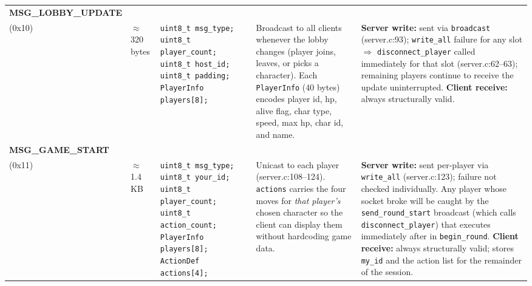 \documentclass[11pt,letterpaper]{article}
\begin{document}
\begin{longtable}{@{}p{1.8cm} p{1.2cm} p{2.4cm} p{4.2cm} p{4.8cm}@{}}
\textbf{MSG\_LOBBY\_UPDATE}\\(0x10) &
$\approx$320 bytes &
\texttt{uint8\_t msg\_type;}\newline
\texttt{uint8\_t player\_count;}\newline
\texttt{uint8\_t host\_id;}\newline
\texttt{uint8\_t padding;}\newline
\texttt{PlayerInfo players[8];} &
Broadcast to all clients whenever the lobby changes (player joins, leaves, or picks a character). Each \texttt{PlayerInfo} (40 bytes) encodes player id, hp, alive flag, char type, speed, max hp, char id, and name. &
\textbf{Server write:} sent via \texttt{broadcast} (server.c:93); \texttt{write\_all} failure for any slot $\Rightarrow$ \texttt{disconnect\_player} called immediately for that slot (server.c:62--63); remaining players continue to receive the update uninterrupted. \textbf{Client receive:} always structurally valid. \\[4pt]

\textbf{MSG\_GAME\_START}\\(0x11) &
$\approx$1.4\,KB &
\texttt{uint8\_t msg\_type;}\newline
\texttt{uint8\_t your\_id;}\newline
\texttt{uint8\_t player\_count;}\newline
\texttt{uint8\_t action\_count;}\newline
\texttt{PlayerInfo players[8];}\newline
\texttt{ActionDef actions[4];} &
Unicast to each player (server.c:108--124). \texttt{actions} carries the four moves for \emph{that player's} chosen character so the client can display them without hardcoding game data. &
\textbf{Server write:} sent per-player via \texttt{write\_all} (server.c:123); failure not checked individually. Any player whose socket broke will be caught by the \texttt{send\_round\_start} broadcast (which calls \texttt{disconnect\_player}) that executes immediately after in \texttt{begin\_round}. \textbf{Client receive:} always structurally valid; stores \texttt{my\_id} and the action list for the remainder of the session. \\[4pt]


\end{longtable}
\end{document}
